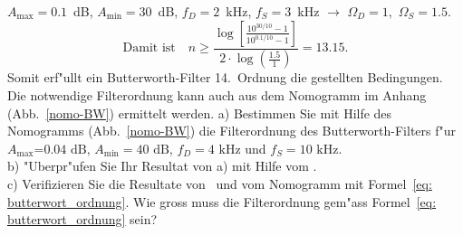 $A_{\max}=0.1$~dB, $A_{\min}=30$~dB, $f_{D}=2$~kHz, $f_{S}=3$~kHz $\longrightarrow$ $\Omega_{D}=1,$ $\Omega_{S}=1.5$.
\[\mbox{Damit ist}\quad
n\geq\frac{\log{\displaystyle\left[\frac{10^{30/10}-1} {10^{0.1/10}-1}\right]}}{2 \cdot \log{\left(\frac{1.5}{1}\right)}}=13.15.
\]
Somit erf"ullt ein Butterworth-Filter 14.~Ordnung die
gestellten Bedingungen. Die notwendige Filterordnung kann auch aus
dem Nomogramm im Anhang (Abb.~\ref{nomo-BW}) ermittelt werden.
\aufg
a) Bestimmen Sie mit Hilfe des Nomogramms (Abb.~\ref{nomo-BW}) die Filterordnung des Butter\-worth-Filters f"ur $A_{\max}\text{=0.04~dB}$, $A_{\min}=\text{40~dB}$, $f_{D}=\text{4~kHz}$ und $f_{S}=\text{10~kHz}$.\\ 
b) "Uberpr"ufen Sie Ihr Resultat von a) mit Hilfe vom .\\
c) Verifizieren Sie  die Resultate von \matlogo~und vom Nomogramm mit Formel~\ref{eq: butterwort_ordnung}. Wie gross muss die Filterordnung gem"ass Formel~\ref{eq: butterwort_ordnung} sein?
\clearpage
